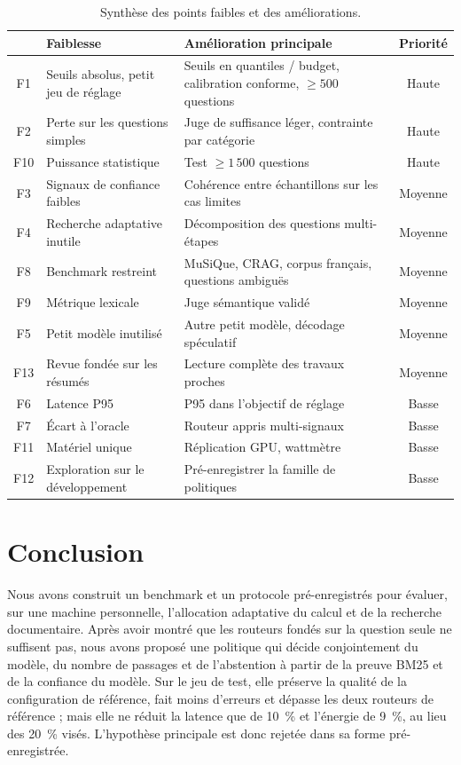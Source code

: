 \documentclass[11pt,a4paper]{article}
\begin{document}
\begin{table}[H]
\centering\small
\begin{tabularx}{\linewidth}{c Y Y c}
\toprule
& Faiblesse & Amélioration principale & Priorité \\
\midrule
F1 & Seuils absolus, petit jeu de réglage & Seuils en quantiles / budget, calibration conforme, $\ge 500$ questions & Haute \\
F2 & Perte sur les questions simples & Juge de suffisance léger, contrainte par catégorie & Haute \\
F10 & Puissance statistique & Test $\ge 1\,500$ questions & Haute \\
F3 & Signaux de confiance faibles & Cohérence entre échantillons sur les cas limites & Moyenne \\
F4 & Recherche adaptative inutile & Décomposition des questions multi-étapes & Moyenne \\
F8 & Benchmark restreint & MuSiQue, CRAG, corpus français, questions ambiguës & Moyenne \\
F9 & Métrique lexicale & Juge sémantique validé & Moyenne \\
F5 & Petit modèle inutilisé & Autre petit modèle, décodage spéculatif & Moyenne \\
F13 & Revue fondée sur les résumés & Lecture complète des travaux proches & Moyenne \\
F6 & Latence P95 & P95 dans l'objectif de réglage & Basse \\
F7 & Écart à l'oracle & Routeur appris multi-signaux & Basse \\
F11 & Matériel unique & Réplication GPU, wattmètre & Basse \\
F12 & Exploration sur le développement & Pré-enregistrer la famille de politiques & Basse \\
\bottomrule
\end{tabularx}
\caption{Synthèse des points faibles et des améliorations.}
\label{tab:faiblesses}
\end{table}

\section{Conclusion}\label{sec:conclusion}

Nous avons construit un benchmark et un protocole pré-enregistrés pour évaluer, sur une machine
personnelle, l'allocation adaptative du calcul et de la recherche documentaire. Après avoir montré que
les routeurs fondés sur la question seule ne suffisent pas, nous avons proposé une politique qui décide
conjointement du modèle, du nombre de passages et de l'abstention à partir de la preuve BM25 et de la
confiance du modèle. Sur le jeu de test, elle préserve la qualité de la configuration de référence, fait
moins d'erreurs et dépasse les deux routeurs de référence ; mais elle ne réduit la latence que de 10~\%
et l'énergie de 9~\%, au lieu des 20~\% visés. L'hypothèse principale est donc rejetée dans sa forme
pré-enregistrée.
\end{document}
